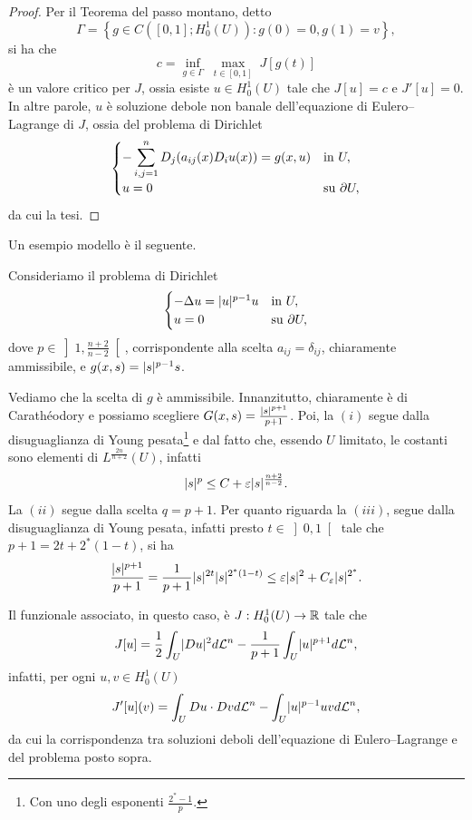 \begin{proof}
Per il Teorema del passo montano, detto 
\[ \Gamma = \left\lbrace g \in C([0,1];H^1_0(U)): g(0) = 0, g(1) = v\right\rbrace,  \]
si ha che 
\[ c = \underset{g \in \Gamma}{\inf}\; \underset{t \in [0,1]}{\max}\; J[g(t)] \]
è un valore critico per $J$, ossia esiste $u \in H^1_0(U)$ tale che $J[u]=c$ e $J'[u] = 0$. In altre parole, $u$ è soluzione debole non banale dell'equazione di Eulero--Lagrange di $J$, ossia del problema di Dirichlet
\[ 	\begin{cases}
	-\displaystyle\sum_{i,j=1}^n D_j(a_{ij}(x)D_iu(x)) = g(x,u) & \textup{in } U,\\
	u = 0 & \textup{su } \partial U,
\end{cases} \]
da cui la tesi.
\end{proof}

Un esempio modello è il seguente.
\begin{esempio}
Consideriamo il problema di Dirichlet
\[ 	\begin{cases}
	-\Delta u = \lvert u\rvert^{p-1}u & \textup{in } U,\\
	u = 0 & \textup{su } \partial U,
\end{cases} \]
dove $p \in \left] 1,\frac{n+2}{n-2}\right[$, corrispondente alla scelta $a_{ij}= \delta_{ij}$, chiaramente ammissibile, e $g(x,s) = \lvert s\rvert^{p-1}s$. 

Vediamo che la scelta di $g$ è ammissibile. Innanzitutto, chiaramente è di Carathéodory e possiamo scegliere $G(x,s) = \frac{\lvert s\rvert^{p+1}}{p+1}$.
Poi, la $(i)$ segue dalla disuguaglianza di Young pesata\footnote{Con uno degli esponenti $\frac{2^\ast-1}{p}$.} e dal fatto che, essendo $U$ limitato, le costanti sono elementi di $L^{\frac{2n}{n+2}}(U)$, infatti  
\[ \lvert s\rvert^p \le C + \varepsilon \lvert s\rvert^{\frac{n+2}{n-2}}.\]
La $(ii)$ segue dalla scelta $q= p+1$. Per quanto riguarda la $(iii)$, segue dalla disuguaglianza di Young pesata, infatti presto $t \in \left] 0,1\right[ $ tale che $p+1 = 2t + 2^\ast(1-t)$, si ha
\[ \frac{\lvert s\rvert^{p+1}}{p+1} = \frac{1}{p+1}\lvert s\rvert^{2t}\lvert s\rvert^{2^\ast(1-t)} \le \varepsilon \lvert s\rvert^2 + C_\varepsilon \lvert s\rvert^{2^\ast}.  \]

Il funzionale associato, in questo caso, è $J: H^1_0(U) \to \mathbb{R}$ tale che
\[ J[u] = \frac{1}{2}\int_U \lvert Du\rvert^2 d\mathcal{L}^n - \frac{1}{p+1} \int_U \lvert u\rvert^{p+1}d\mathcal{L}^n, \]
infatti, per ogni $u,v \in H^1_0(U)$
\[ J'[u](v) = \int_U Du \cdot Dvd\mathcal{L}^n - \int_U \lvert u\rvert^{p-1}uv d\mathcal{L}^n, \]
da cui la corrispondenza tra soluzioni deboli dell'equazione di Eulero--Lagrange e del problema posto sopra.
\end{esempio}
